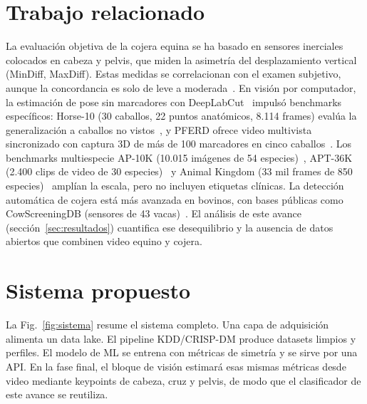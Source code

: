 \documentclass[conference,a4paper]{IEEEtran}
\begin{document}
\section{Trabajo relacionado}
La evaluación objetiva de la cojera equina se ha basado en sensores inerciales colocados en cabeza y pelvis, que miden la asimetría del desplazamiento vertical (MinDiff, MaxDiff). Estas medidas se correlacionan con el examen subjetivo, aunque la concordancia es solo de leve a moderada~\cite{keegan2013}. En visión por computador, la estimación de pose sin marcadores con DeepLabCut~\cite{mathis2018} impulsó benchmarks específicos: Horse-10 (30 caballos, 22 puntos anatómicos, 8.114 frames) evalúa la generalización a caballos no vistos~\cite{mathis2021}, y PFERD ofrece video multivista sincronizado con captura 3D de más de 100 marcadores en cinco caballos~\cite{li2024pferd}. Los benchmarks multiespecie AP-10K (10.015 imágenes de 54 especies)~\cite{yu2021ap10k}, APT-36K (2.400 clips de video de 30 especies)~\cite{yang2022apt36k} y Animal Kingdom (33 mil frames de 850 especies)~\cite{ng2022animalkingdom} amplían la escala, pero no incluyen etiquetas clínicas. La detección automática de cojera está más avanzada en bovinos, con bases públicas como CowScreeningDB (sensores de 43 vacas)~\cite{ismail2024cow}. El análisis de este avance (sección~\ref{sec:resultados}) cuantifica ese desequilibrio y la ausencia de datos abiertos que combinen video equino y cojera.

\section{Sistema propuesto}
La Fig.~\ref{fig:sistema} resume el sistema completo. Una capa de adquisición alimenta un data lake. El pipeline KDD/CRISP-DM produce datasets limpios y perfiles. El modelo de ML se entrena con métricas de simetría y se sirve por una API. En la fase final, el bloque de visión estimará esas mismas métricas desde video mediante keypoints de cabeza, cruz y pelvis, de modo que el clasificador de este avance se reutiliza.
\end{document}
